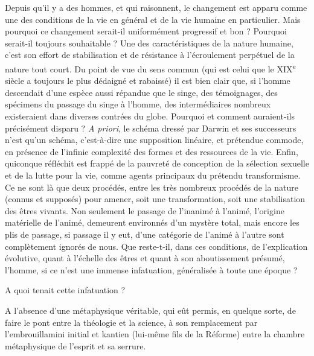 \documentclass[french,twoside]{book} %
\begin{document}
Depuis qu’il y a des hommes, et qui raisonnent, le changement est apparu comme une des conditions de la vie en général et de la vie humaine en particulier. Mais pourquoi ce changement serait-il uniformément progressif et bon ? Pourquoi serait-il toujours souhaitable ? Une des caractéristiques de la nature humaine, c’est son effort de stabilisation et de résistance à l’écroulement perpétuel de la nature tout court. Du point de vue du sens commun (qui est celui que le XIX\textsuperscript{e} siècle a toujours le plus dédaigné et rabaissé) il est bien clair que, si l’homme descendait d’une espèce aussi répandue que le singe, des témoignages, des spécimens du passage du singe à l’homme, des intermédiaires nombreux existeraient dans diverses contrées du globe. Pourquoi et comment auraient-ils précisément disparu ? {\itshape A priori}, le schéma dressé par Darwin et ses successeurs n’est qu’un schéma, c’est-à-dire une supposition linéaire, et prétendue commode, en présence de l’infinie complexité des formes et des ressources de la vie. Enfin, quiconque réfléchit est frappé de la pauvreté de conception de la sélection sexuelle et de la lutte pour la vie, comme agents principaux du prétendu transformisme. Ce ne sont là que deux procédés, entre les très nombreux procédés de la nature (connus et supposés) pour amener, soit une transformation, soit une stabilisation des êtres vivants. Non seulement le passage de l’inanimé à l’animé, l’origine matérielle de l’animé, demeurent environnés d’un mystère total, mais encore les plis de passage, si passage il y eut, d’une catégorie de l’animé à l’autre sont complètement ignorés de nous. Que reste-t-il, dans ces conditions, de l’explication évolutive, quant à l’échelle des êtres et quant à son aboutissement présumé, l’homme, si ce n’est une immense infatuation, généralisée à toute une époque ?\par
A quoi tenait cette infatuation ?\par
A l’absence d’une métaphysique véritable, qui eût permis, en quelque sorte, de faire le pont entre la théologie et la science, à son remplacement par l’embrouillamini initial et kantien (lui-même fils de la Réforme) entre la chambre métaphysique de l’esprit et sa serrure.\par
\end{document}
